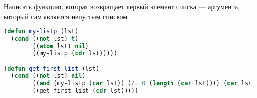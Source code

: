 Написать функцию, которая возвращает первый элемент списка --- аргумента, который сам
является непустым списком.

\begin{lstlisting}[language=Lisp]
(defun my-listp (lst)
  (cond ((not lst) t)
        ((atom lst) nil)
        ((my-listp (cdr lst)))))

(defun get-first-list (lst)
  (cond ((not lst) nil)
        ((and (my-listp (car lst)) (/= 0 (length (car lst)))) (car lst))
        ((get-first-list (cdr lst)))))
\end{lstlisting}


